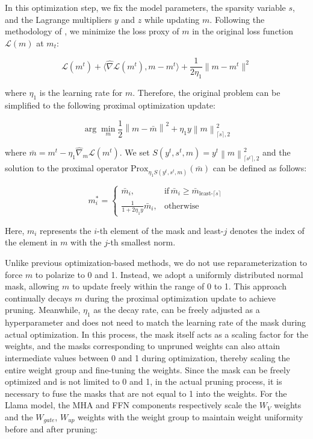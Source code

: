 In this optimization step, we fix the model parameters, the sparsity variable \( s \), and the Lagrange multipliers \( y \) and \( z \) while updating \( m \). Following the methodology of \cite{yang2019ecc}, we minimize the loss proxy of \( m \) in the original loss function \( \mathcal{L}(m) \) at \( m_t \):

\begin{equation*}
\mathcal{L}(m^t) + \langle \hat{\nabla} \mathcal{L}(m^t), m - m^t \rangle + \frac{1}{2\eta_1} \| m - m^t \|^2
\end{equation*}


where ${\eta_1}$ is the learning rate for $m$. Therefore, the original problem can be simplified to the following proximal optimization update:

\begin{equation*}
\arg\min_m \frac{1}{2} \left\| m - \bar{m} \right\|^2 + \eta_1 y \left\| m \right\|_{\lceil s \rceil,2}^2
\end{equation*}

where $\bar{m}=m^t-\eta_1\hat{\nabla}_m\mathcal{L}(m^t).$
We set $S(y^t,s^t,m) = {y^t\left\|m\right\|_{\lceil s^t \rceil,2}^2}$ and the solution to the proximal operator $\mathrm{Prox}_{\eta_1S(y^t,s^t,m)}(\bar{m})$ can be defined as follows:

\begin{equation*}
m_i^* = 
\begin{cases}
\bar{m}_i, & \mathrm{if}\,\bar{m}_i \geq \bar{m}_{\text{least-}\lceil s\rceil} \\
\frac{1}{1+2\eta_1y} \bar{m}_i, & \text{otherwise}
\end{cases}
\end{equation*}


Here, $m_i$ represents the $i$-th element of the mask and least-$j$ denotes the index of the element in $m$ with the $j$-th smallest norm.

Unlike previous optimization-based methods, we do not use reparameterization to force $m$ to polarize to 
0 and 1. Instead, we adopt a uniformly distributed normal mask, allowing $m$ to update freely within the range of 0 to 1. This approach continually decays $m$ during the proximal optimization update to achieve pruning. Meanwhile, $\eta_1$ as the decay rate, can be freely adjusted as a hyperparameter and does not need to match the learning rate of the mask during actual optimization. In this process, the mask itself acts as a scaling factor for the weights, and the masks corresponding to unpruned weights can also attain intermediate values between 0 and 1 during optimization, thereby scaling the entire weight group and fine-tuning the weights. Since the mask can be freely optimized and is not limited to 0 and 1, in the actual pruning process, it is necessary to fuse the masks that are not equal to 1 into the weights. For the Llama model, the MHA and FFN components respectively scale the $W_V$ weights and the $W_{gate}$, $W_{up}$ weights with the weight group to maintain weight uniformity before and after pruning:

